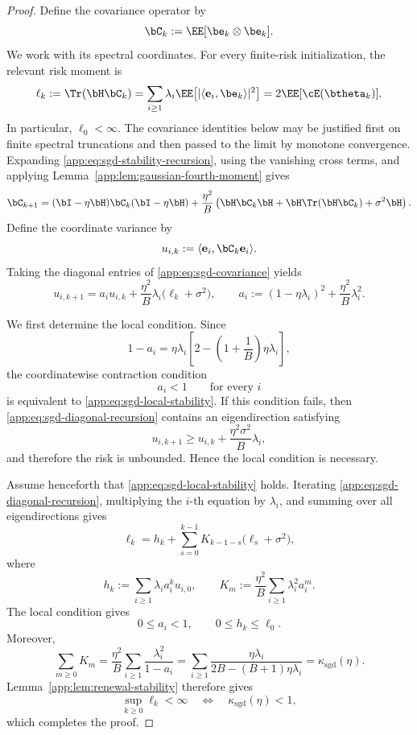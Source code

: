 \documentclass[11pt]{article}
\newcommand{\sgd}{\mathrm{sgd}}
\begin{document}
\begin{proof}
Define the covariance operator by
\[
\bC_k:=\EE[\be_k\otimes\be_k].
\]
We work with its spectral coordinates. For every finite-risk initialization, the relevant risk moment is
\[
\ell_k
:=
\Tr(\bH\bC_k)
=
\sum_{i\geq1}\lambda_i
\EE\bigl[|\langle\mathbf e_i,\be_k\rangle|^2\bigr]
=
2\EE[\cE(\btheta_k)].
\]
In particular, \(\ell_0<\infty\). The covariance identities below may be justified first on finite spectral
truncations and then passed to the limit by monotone convergence. Expanding
\eqref{app:eq:sgd-stability-recursion}, using the vanishing cross terms, and applying
Lemma~\ref{app:lem:gaussian-fourth-moment} gives
\begin{equation}
\label{app:eq:sgd-covariance}
\bC_{k+1}
=
(\bI-\eta\bH)\bC_k(\bI-\eta\bH)
+
\frac{\eta^2}{B}
\left(
\bH\bC_k\bH
+
\bH\Tr(\bH\bC_k)
+
\sigma^2\bH
\right).
\end{equation}
Define the coordinate variance by
\[
u_{i,k}:=\langle\mathbf e_i,\bC_k\mathbf e_i\rangle.
\]
Taking the diagonal entries of \eqref{app:eq:sgd-covariance} yields
\begin{equation}
\label{app:eq:sgd-diagonal-recursion}
u_{i,k+1}
=
a_i u_{i,k}
+
\frac{\eta^2}{B}\lambda_i\bigl(\ell_k+\sigma^2\bigr),
\qquad
a_i:=(1-\eta\lambda_i)^2+\frac{\eta^2}{B}\lambda_i^2.
\end{equation}

We first determine the local condition. Since
\[
1-a_i
=
\eta\lambda_i
\left[
2-\left(1+\frac1B\right)\eta\lambda_i
\right],
\]
the coordinatewise contraction condition
\[
a_i<1
\qquad\text{for every }i
\]
is equivalent to
\eqref{app:eq:sgd-local-stability}. If this condition fails, then
\eqref{app:eq:sgd-diagonal-recursion} contains an eigendirection satisfying
\[
u_{i,k+1}
\geq
u_{i,k}+\frac{\eta^2\sigma^2}{B}\lambda_i,
\]
and therefore the risk is unbounded. Hence the local condition is necessary.

Assume henceforth that \eqref{app:eq:sgd-local-stability} holds. Iterating
\eqref{app:eq:sgd-diagonal-recursion}, multiplying the \(i\)-th equation by \(\lambda_i\), and summing
over all eigendirections gives
\begin{equation}
\label{app:eq:sgd-renewal}
\ell_k
=
h_k
+
\sum_{s=0}^{k-1}
K_{k-1-s}\bigl(\ell_s+\sigma^2\bigr),
\end{equation}
where
\[
h_k:=\sum_{i\geq1}\lambda_i a_i^k u_{i,0},
\qquad
K_m:=\frac{\eta^2}{B}\sum_{i\geq1}\lambda_i^2a_i^m.
\]
The local condition gives
\[
0\leq a_i<1,
\qquad
0\leq h_k\leq \ell_0.
\]
Moreover,
\[
\sum_{m\geq0}K_m
=
\frac{\eta^2}{B}
\sum_{i\geq1}\frac{\lambda_i^2}{1-a_i}
=
\sum_{i\geq1}
\frac{\eta\lambda_i}{2B-(B+1)\eta\lambda_i}
=
\kappa_{\sgd}(\eta).
\]
Lemma~\ref{app:lem:renewal-stability} therefore gives
\[
\sup_{k\geq0}\ell_k<\infty
\quad\Longleftrightarrow\quad
\kappa_{\sgd}(\eta)<1,
\]
which completes the proof.

\end{proof}
\end{document}
